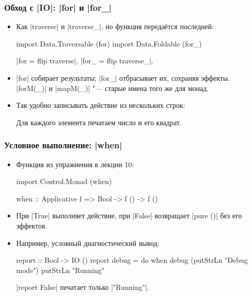 \documentclass[11pt]{beamer}
\begin{document}
\begin{frame}[fragile]
  \frametitle{Обход с \haskinline|IO|: \haskinline|for| и \haskinline|for_|}
  \begin{itemize}
    \item Как \haskinline|traverse| и \haskinline|traverse_|, но функция передаётся последней:
          \begin{haskellsmall}
            import Data.Traversable (for)
            import Data.Foldable (for_)
          \end{haskellsmall}
          \haskinline|for = flip traverse|, \haskinline|for_ = flip traverse_|.
    \item \haskinline|for| собирает результаты; \haskinline|for_| отбрасывает их, сохраняя эффекты. \haskinline|forM(_)| и \haskinline|mapM(_)| "--- старые имена того же для монад.
          \pause
    \item Так удобно записывать действие из нескольких строк:
          Для каждого элемента печатаем число и его квадрат.
  \end{itemize}
\end{frame}

\begin{frame}[fragile]
  \frametitle{Условное выполнение: \haskinline|when|}
  \begin{itemize}
    \item Функция из упражнения в лекции 10:
          \begin{haskellsmall}
            import Control.Monad (when)

            when :: Applicative f => Bool -> f () -> f ()
          \end{haskellsmall}
    \item При \haskinline|True| выполняет действие, при \haskinline|False| возвращает \haskinline|pure ()| без его эффектов.
          \pause
    \item Например, условный диагностический вывод:
          \begin{haskellsmall}
            report :: Bool -> IO ()
            report debug = do
              when debug (putStrLn "Debug mode")
              putStrLn "Running"
          \end{haskellsmall}
          \haskinline|report False| печатает только \haskinline|"Running"|.
  \end{itemize}
\end{frame}
\end{document}
